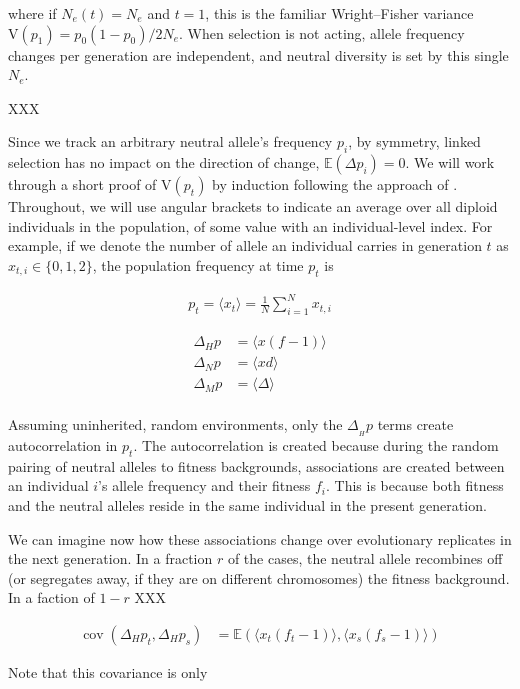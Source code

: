 \documentclass[11pt]{article}
\newcommand{\E}{\mathbb{E}}
\newcommand{\V}{\text{V}}
\DeclareMathOperator{\cov}{cov}
\begin{document}
where if $N_e(t) = N_e$ and $t=1$, this is the familiar Wright--Fisher variance
$\V(p_1) = p_0(1-p_0) / 2N_e$. When selection is not acting, allele frequency
changes per generation are independent, and neutral diversity is set by this
single $N_e$. 

XXX

Since we track an arbitrary neutral allele's frequency $p_i$, by symmetry,
linked selection has no impact on the direction of change, $\E(\Delta p_i) =
0$. We will work through a short proof of $\V(p_t)$ by induction following the
approach of \textcite{Santiago1995-hx}. Throughout, we will use angular
brackets to indicate an average over all diploid individuals in the population,
of some value with an individual-level index. For example, if we denote the
number of allele an individual carries in generation $t$ as $x_{t,i} \in \{0,
1, 2\}$, the population frequency at time $p_t$ is

\begin{align}
  p_t = \langle x_t \rangle = \frac{1}{N} \sum_{i=1}^N x_{t,i}
\end{align}


\begin{align}
  \Delta_H p &= \langle x (f-1) \rangle \\
  \Delta_N p &= \langle x d \rangle \\
  \Delta_M p &= \langle \Delta \rangle \\
\end{align}

Assuming uninherited, random environments, only the $\Delta_{_H} p$ terms
create autocorrelation in $p_t$. The autocorrelation is created because during
the random pairing of neutral alleles to fitness backgrounds, associations are
created between an individual $i$'s allele frequency and their fitness $f_i$.
This is because both fitness and the neutral alleles reside in the same
individual in the present generation. 

We can imagine now how these associations change over evolutionary replicates
in the next generation. In a fraction $r$ of the cases, the neutral allele 
recombines off (or segregates away, if they are on different chromosomes) the
fitness background. In a faction of $1-r$ XXX

\begin{align}
  \cov(\Delta_H p_t, \Delta_H p_s) &= \E(\langle x_t (f_t-1) \rangle , \langle x_s (f_s-1) \rangle)
\end{align}

Note that this covariance is only 
\end{document}

